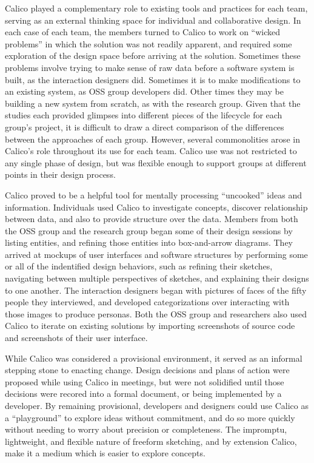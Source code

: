 Calico played a complementary role to existing tools and practices for each team, serving as an external thinking space for individual and collaborative design. In each case of each team, the members turned to Calico to work on ``wicked problems'' in which the solution was not readily apparent, and required some exploration of the design space before arriving at the solution. Sometimes these problems involve trying to make sense of raw data before a software system is built, as the interaction designers did. Sometimes it is to make modifications to an existing system, as OSS group developers did. Other times they may be building a new system from scratch, as with the research group. Given that the studies each provided glimpses into different pieces of the lifecycle for each group's project, it is difficult to draw a direct comparison of the differences between the approaches of each group. However, several commonolities arose in Calico's role throughout its use for each team. Calico use was not restricted to any single phase of design, but was flexible enough to support groups at different points in their design process.

Calico proved to be a helpful tool for mentally processing ``uncooked'' ideas and information. Individuals used Calico to investigate concepts, discover relationship between data, and also to provide structure over the data. Members from both the OSS group and the research group began some of their design sessions by listing entities, and refining those entities into box-and-arrow diagrams. They arrived at mockups of user interfaces and software structures by performing some or all of the indentified design behaviors, such as refining their sketches, navigating between multiple perspectives of sketches, and explaining their designs to one another. The interaction designers began with pictures of faces of the fifty people they interviewed, and developed categorizations over interacting with those images to produce personas. Both the OSS group and researchers also used Calico to iterate on existing solutions by importing screenshots of source code and screenshots of their user interface.


While Calico was considered a provisional environment, it served as an informal stepping stone to enacting change. Design decisions and plans of action were proposed while using Calico in meetings, but were not solidified until those decisions were recored into a formal document, or being implemented by a developer. By remaining provisional, developers and designers could use Calico as a ``playground'' to explore ideas without commitment, and do so more quickly without needing to worry about precision or completeness. The impromptu, lightweight, and flexible nature of freeform sketching, and by extension Calico, make it a medium which is easier to explore concepts. 

